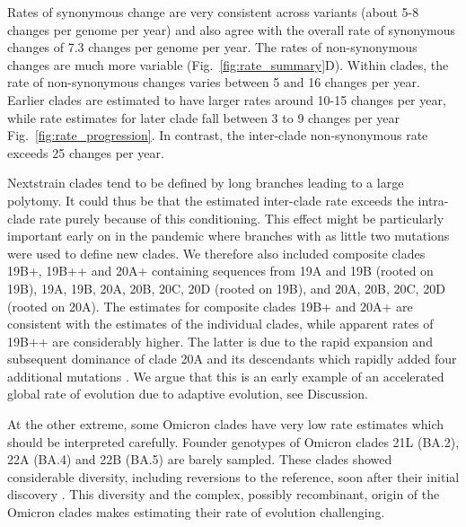 \documentclass[aps,rmp, twocolumn]{revtex4}
\begin{document}
Rates of synonymous change are very consistent across variants (about 5-8 changes per genome per year) and also agree with the overall rate of synonymous changes of 7.3 changes per genome per year.
The rates of non-synonymous changes are much more variable (Fig.~\ref{fig:rate_summary}D).
Within clades, the rate of non-synonymous changes varies between 5 and 16 changes per year.
Earlier clades are estimated to have larger rates around 10-15 changes per year, while rate estimates for later clade fall  between 3 to 9 changes per year Fig.~\ref{fig:rate_progression}.
In contrast, the inter-clade non-synonymous rate exceeds 25 changes per year.

Nextstrain clades tend to be defined by long branches leading to a large polytomy.
It could thus be that the estimated inter-clade rate exceeds the intra-clade rate purely because of this conditioning.
This effect might be particularly important early on in the pandemic where branches with as little two mutations were used to define new clades.
We therefore also included composite clades 19B+, 19B++ and 20A+ containing sequences from 19A and 19B (rooted on 19B), 19A, 19B, 20A, 20B, 20C, 20D (rooted on 19B), and 20A, 20B, 20C, 20D (rooted on 20A).
The estimates for composite clades 19B+ and 20A+ are consistent with the estimates of the individual clades, while apparent rates of 19B++ are considerably higher.
The latter is due to the rapid expansion and subsequent dominance of clade 20A and its descendants which rapidly added four additional mutations \citep{korber_tracking_2020}.
We argue that this is an early example of an accelerated global rate of evolution due to adaptive evolution, see Discussion.

At the other extreme, some Omicron clades have very low rate estimates which should be interpreted carefully.
Founder genotypes of Omicron clades 21L (BA.2), 22A (BA.4) and 22B (BA.5) are barely sampled.
These clades showed considerable diversity, including reversions to the reference, soon after their initial discovery \citep{tegally_emergence_2022}.
This diversity and the complex, possibly recombinant, origin of the Omicron clades makes estimating their rate of evolution challenging.
\end{document}
